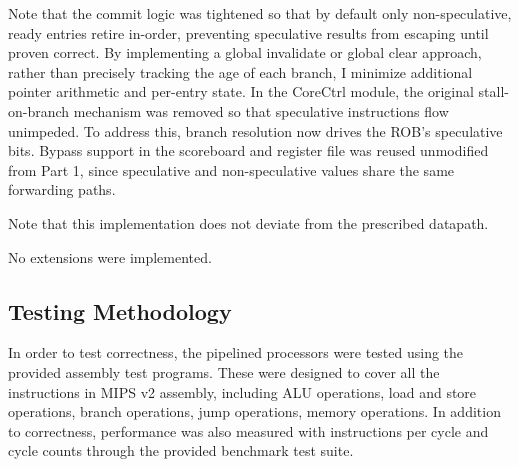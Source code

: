 \documentclass[11pt]{article}
\begin{document}
Note that the commit logic was tightened so that by default only non-speculative, ready
entries retire in-order, preventing speculative results from escaping until
proven correct. By implementing a global invalidate or global
clear approach, rather than precisely tracking the age of each branch, I
minimize additional pointer arithmetic and per-entry state. In the CoreCtrl
module, the original stall-on-branch mechanism was removed so that speculative
instructions flow unimpeded. To address this, branch resolution now drives the ROB’s
speculative bits. Bypass support in the scoreboard and register file was reused
unmodified from Part 1, since speculative and non-speculative values share the
same forwarding paths.

Note that this implementation does not deviate from the prescribed datapath.


\noindent No extensions were implemented.

\subsection*{Testing Methodology}

In order to test correctness, the pipelined processors were tested using the
provided assembly test programs. These were designed to cover all the instructions in MIPS v2 assembly, 
including ALU operations, load and store operations, branch operations, jump operations, 
memory operations. In addition to correctness, performance was also measured with instructions per
cycle and cycle counts through the provided benchmark test suite. 
%
\end{document}
